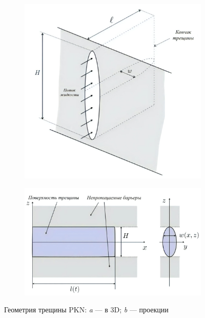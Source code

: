 \begin{figure}[H]
	\begin{subfigure}[t]{\dimexpr.5\linewidth-1.3em\relax}
		\centering
		\includegraphics[width=.95\linewidth,valign=t]{images/pkn_model_in_3D_better.jpg}
	\end{subfigure}
\hfill %
	\begin{subfigure}[t]{\dimexpr.5\linewidth-1.3em\relax}
		\centering
		\includegraphics[width=.95\linewidth,valign=t]{images/pkn_model_projections_better.jpg}
	\end{subfigure}
\captionsetup{justification=centering} %
\caption{Геометрия трещины PKN: {\itshape a} --- в 3D; {\itshape b} --- проекции} 
\label{fig:pkn-model}
\end{figure}

